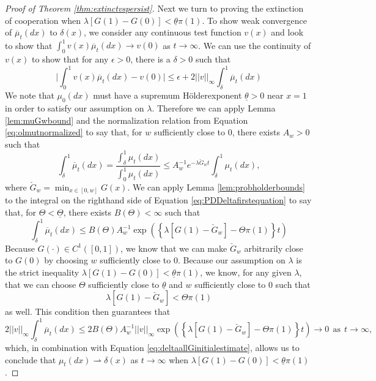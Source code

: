 \documentclass[11pt]{article}
\numberwithin{equation}{section}
\newcommand{\ol}{\overline}
\newcommand{\holder}{H{\"o}lder\:}
\newcommand{\supholderupperbound}[1]{B(#1)}
\begin{document}
{\begin{proof} [Proof of Theorem \ref{thm:extinctvspersist}]
Next we turn to proving the extinction of cooperation when $\lambda \left[G(1) - G(0) \right] < \underline{\theta} \pi(1)$. To show weak convergence of $\ol{\mu}_t(dx)$ to $\delta(x)$, we consider any continuous test function $v(x)$ and look to show that $\int_0^1 v(x) \ol{\mu}_t(dx) \to v(0)$ as $t \to \infty$. We can use the continuity of $v(x)$ to show that for any $\epsilon > 0$, there  is a $\delta > 0$ such that
\begin{equation} \label{eq:deltaallGinitialestimate} \bigg| \int_0^1 v(x) \ol{\mu}_t(dx) - v(0)   \bigg| \leq \epsilon + 2 ||v||_{\infty} \int_{\delta}^1 \ol{\mu}_t(dx)  %
\end{equation}
%
We note that $\mu_0(dx)$ must have a supremum \holder exponent
$\underline{\theta} > 0$ near $x=1$ in order to satisfy our assumption on $\lambda$. Therefore we can apply Lemma \ref{lem:muGwbound} and the normalization relation from Equation \eqref{eq:olmutnormalized} to say that, for $w$ sufficiently close to $0$, there exists $A_w > 0$ such that 
\begin{equation} \label{eq:PDDeltafirstequation}
\int_{\delta}^1 \ol{\mu}_t(dx) = \frac{\int_{\delta}^1 \mu_t(dx)}{\int_0^1 \mu_t(dx) }\leq A_w^{-1} e^{-\lambda \check{G}_w t} \int_{\delta}^1 \mu_t(dx),
\end{equation} 
where $\check{G}_w = \min_{x \in [0,w]} G(x)$. We can apply Lemma \ref{lem:probholderbounds} to the integral on the righthand side of Equation \eqref{eq:PDDeltafirstequation} to say that, for $\Theta < \underline{\Theta}$, there exists $\supholderupperbound{\Theta} < \infty$ such that 
\begin{equation}
    \int_{\delta}^1 \ol{\mu}_t(dx) \leq \supholderupperbound{\Theta}  A_w^{-1} \exp\left(\left\{ \lambda \left[G(1) - \check{G}_w \right] - \Theta \pi(1) \right\} t \right)
\end{equation}
Because $G(\cdot) \in C^1([0,1])$, we know that we can make $\check{G}_w$ arbitrarily close to $G(0)$ by choosing $w$ sufficiently close to $0$. Because our assumption on $\lambda$ is the strict inequality $\lambda \left[ G(1) - G(0) \right] < \underline{\theta}  \pi(1)$, we know, for any given $\lambda$, that we can choose $\Theta$ sufficiently close to $\underline{\theta}$ and $w$ sufficiently close to $0$ such that \begin{equation} \label{eq:conditionapproximate} \lambda \left[ G(1) - \check{G}_w\right] <  \Theta \pi(1) \end{equation} as well. This condition then guarantees that 
\begin{dmath*} 2 ||v||_{\infty}  \int_{\delta}^1 \ol{\mu}_t(dx) \leq 2 B(\Theta) A_w^{-1} ||v||_{\infty}  \exp\left( \left\{ \lambda \left[G(1) - \check{G}_w \right] - \Theta \pi(1) \right\} t  \right)   \to 0 \: \: \mathrm{as} \: \: t \to \infty, \end{dmath*}
which, in combination with Equation \eqref{eq:deltaallGinitialestimate}, allows us to conclude that $\mu_t(dx) \rightharpoonup \delta(x)$ as $t \to \infty$ when $\lambda \left[G(1) - G(0)\right] < \underline{\theta} \pi(1)$.
\end{proof}

}
\end{document}
